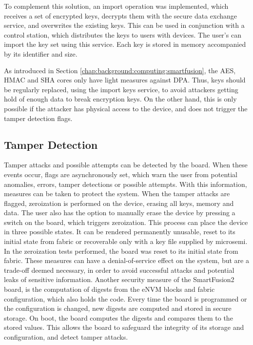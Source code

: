 To complement this solution, an import operation was implemented, which receives a set of encrypted keys, decrypts them with the secure data exchange service, and overwrites the existing keys. This can be used in conjunction with a control station, which distributes the keys to users with devices. The user's can import the key set using this service.
Each key is stored in memory accompanied by its identifier and size.

As introduced in Section \ref{chap:background:computing:smartfusion}, the AES, HMAC and SHA cores only have light measures against DPA. Thus, keys should be regularly replaced, using the import keys service, to avoid attackers getting hold of enough data to break encryption keys. On the other hand, this is only possible if the attacker has physical access to the device, and does not trigger the tamper detection flags. 

\subsection{Tamper Detection}\label{chap:implementation:services:tamper-detection}

Tamper attacks and possible attempts can be detected by the board. When these events occur, flags are asynchronously set, which warn the user from potential anomalies, errors, tamper detections or possible attempts. With this information, measures can be taken to protect the system. %
When the tamper attacks are flagged, zeroization is performed on the device, erasing all keys, memory and data.
The user also has the option to manually erase the device by pressing a switch on the board, which triggers zeroization.
This process can place the device in three possible states. It can be rendered permanently unusable, reset to its initial state from fabric or recoverable only with a key file supplied by microsemi. In the zeroization tests performed, the board was reset to its initial state from fabric.
These measures can have a denial-of-service effect on the system, but are a trade-off deemed necessary, in order to avoid successful attacks and potential leaks of sensitive information.
Another security measure of the SmartFusion2 board, is the computation of digests from the eNVM blocks and fabric configuration, which also holds the code. Every time the board is programmed or the configuration is changed, new digests are computed and stored in secure storage. On boot, the board computes the digests and compares them to the stored values. This allows the board to safeguard the integrity of its storage and configuration, and detect tamper attacks.

